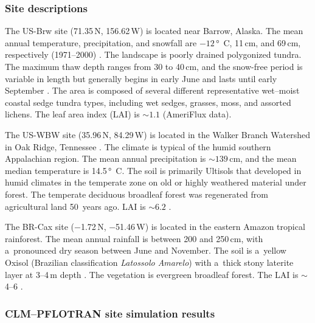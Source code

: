 \documentclass[gmd,noline]{copernicus}
\begin{document}
\subsubsection{Site descriptions}%

      The US-Brw site (71.35{\degree}\,N, 156.62{\degree}\,W) is located
      near Barrow, Alaska. The mean annual temperature, precipitation, and
      snowfall are $-12$\,\unit{\degree C}, 11\,\unit{cm}, and
      69\,\unit{cm}, respectively (1971--2000) \citep{Lara2012}. The
      landscape is poorly drained polygonized tundra. The maximum thaw depth
      ranges from 30 to 40\,\unit{cm}, and the snow-free period is variable
      in length but generally begins in early June and lasts until early
      September \citep{Hinkel2003}. The area is composed of several
      different representative wet--moist coastal sedge tundra types,
      including wet sedges, grasses, moss, and assorted lichens. The leaf
      area index (LAI) is $\sim 1.1$ (AmeriFlux data).

      The US-WBW site (35.96{\degree}\,N, 84.29{\degree}\,W) is located in
      the Walker Branch Watershed in Oak Ridge, Tennessee
      \citep{Hanson2003}. The climate is typical of the humid southern
      Appalachian region. The mean annual precipitation is $\sim
      139$\,\unit{cm}, and the mean median temperature is
      14.5\,\unit{\degree C}.  The soil is primarily Ultisols that developed
      in humid climates in the temperate zone on old or highly weathered
      material under forest. The temperate deciduous broadleaf forest was
      regenerated from agricultural land 50~years ago.  LAI is $\sim 6.2$
      \citep{Hanson2004}.

      The BR-Cax site ($-$1.72{\degree}\,N, $-$51.46{\degree}\,W) is located
      in the eastern Amazon tropical rainforest. The mean annual rainfall is
      between 200 and 250\,\unit{cm}, with a~pronounced dry season between
      June and November. The soil is a~yellow Oxisol (Brazilian
      classification \textit{Latossolo Amarelo}) with a~thick stony laterite layer at
      3--4\,m depth \citep{daCosta2010}. The vegetation is evergreen
      broadleaf forest. The LAI is $\sim$ 4--6 \citep{Powell2013}.



\subsubsection{CLM--PFLOTRAN site simulation results}%
\end{document}
